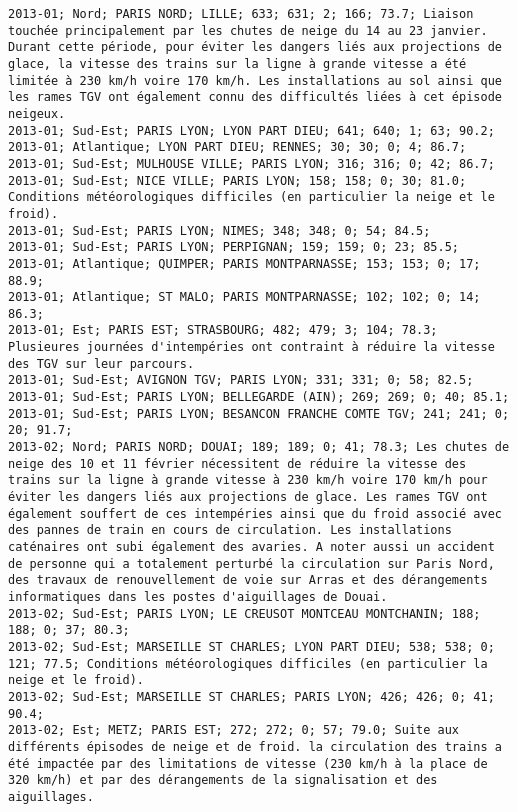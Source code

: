 \documentclass{article}
\begin{document}
\begin{Verbatim}[commandchars=\\\{\}]
2013-01; Nord; PARIS NORD; LILLE; 633; 631; 2; 166; 73.7; Liaison touchée principalement par les chutes de neige du 14 au 23 janvier. Durant cette période, pour éviter les dangers liés aux projections de glace, la vitesse des trains sur la ligne à grande vitesse a été limitée à 230 km/h voire 170 km/h. Les installations au sol ainsi que les rames TGV ont également connu des difficultés liées à cet épisode neigeux.
2013-01; Sud-Est; PARIS LYON; LYON PART DIEU; 641; 640; 1; 63; 90.2; 
2013-01; Atlantique; LYON PART DIEU; RENNES; 30; 30; 0; 4; 86.7; 
2013-01; Sud-Est; MULHOUSE VILLE; PARIS LYON; 316; 316; 0; 42; 86.7; 
2013-01; Sud-Est; NICE VILLE; PARIS LYON; 158; 158; 0; 30; 81.0; Conditions météorologiques difficiles (en particulier la neige et le froid).
2013-01; Sud-Est; PARIS LYON; NIMES; 348; 348; 0; 54; 84.5; 
2013-01; Sud-Est; PARIS LYON; PERPIGNAN; 159; 159; 0; 23; 85.5; 
2013-01; Atlantique; QUIMPER; PARIS MONTPARNASSE; 153; 153; 0; 17; 88.9; 
2013-01; Atlantique; ST MALO; PARIS MONTPARNASSE; 102; 102; 0; 14; 86.3; 
2013-01; Est; PARIS EST; STRASBOURG; 482; 479; 3; 104; 78.3; Plusieures journées d'intempéries ont contraint à réduire la vitesse des TGV sur leur parcours.
2013-01; Sud-Est; AVIGNON TGV; PARIS LYON; 331; 331; 0; 58; 82.5; 
2013-01; Sud-Est; PARIS LYON; BELLEGARDE (AIN); 269; 269; 0; 40; 85.1; 
2013-01; Sud-Est; PARIS LYON; BESANCON FRANCHE COMTE TGV; 241; 241; 0; 20; 91.7; 
2013-02; Nord; PARIS NORD; DOUAI; 189; 189; 0; 41; 78.3; Les chutes de neige des 10 et 11 février nécessitent de réduire la vitesse des trains sur la ligne à grande vitesse à 230 km/h voire 170 km/h pour éviter les dangers liés aux projections de glace. Les rames TGV ont également souffert de ces intempéries ainsi que du froid associé avec des pannes de train en cours de circulation. Les installations caténaires ont subi également des avaries. A noter aussi un accident de personne qui a totalement perturbé la circulation sur Paris Nord, des travaux de renouvellement de voie sur Arras et des dérangements informatiques dans les postes d'aiguillages de Douai.
2013-02; Sud-Est; PARIS LYON; LE CREUSOT MONTCEAU MONTCHANIN; 188; 188; 0; 37; 80.3; 
2013-02; Sud-Est; MARSEILLE ST CHARLES; LYON PART DIEU; 538; 538; 0; 121; 77.5; Conditions météorologiques difficiles (en particulier la neige et le froid).
2013-02; Sud-Est; MARSEILLE ST CHARLES; PARIS LYON; 426; 426; 0; 41; 90.4; 
2013-02; Est; METZ; PARIS EST; 272; 272; 0; 57; 79.0; Suite aux différents épisodes de neige et de froid. la circulation des trains a été impactée par des limitations de vitesse (230 km/h à la place de 320 km/h) et par des dérangements de la signalisation et des aiguillages.

\end{Verbatim}
\end{document}
